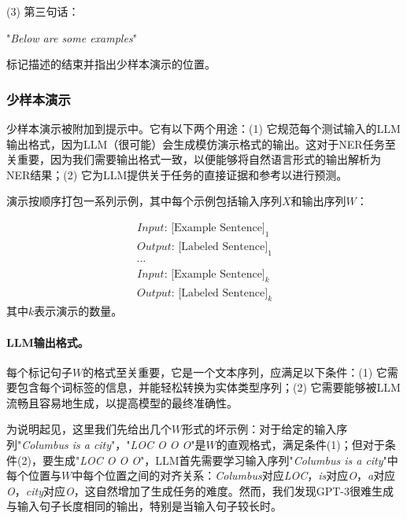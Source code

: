 \documentclass[supercite]{Experimental_Report}
\theoremstyle{definition}
\begin{document}
(3) 第三句话：

"\textit{Below are some examples}"

\noindent 标记描述的结束并指出少样本演示的位置。

\subsubsection{少样本演示}
\label{few_shot_demonstration}

少样本演示被附加到提示中。它有以下两个用途：(1) 它规范每个测试输入的LLM输出格式，因为LLM（很可能）会生成模仿演示格式的输出。这对于NER任务至关重要，因为我们需要输出格式一致，以便能够将自然语言形式的输出解析为NER结果；(2) 它为LLM提供关于任务的直接证据和参考以进行预测。

演示按顺序打包一系列示例，其中每个示例包括输入序列$X$和输出序列$W$：

\begin{equation}
\nonumber
    \begin{aligned}
      \textit{Input: }\text{[Example Sentence]}_{1} \\
      \textit{Output: }\text{[Labeled Sentence]}_{1} \\
      \cdots \\
      \textit{Input: }\text{[Example Sentence]}_{k} \\
      \textit{Output: }\text{[Labeled Sentence]}_{k}
    \end{aligned}
\end{equation}
其中$k$表示演示的数量。

\paragraph{LLM输出格式。}
\label{llm_format}
每个标记句子$W$的格式至关重要，它是一个文本序列，应满足以下条件：(1) 它需要包含每个词标签的信息，并能轻松转换为实体类型序列；(2) 它需要能够被LLM流畅且容易地生成，以提高模型的最终准确性。

为说明起见，这里我们先给出几个$W$形式的坏示例：对于给定的输入序列"{\it Columbus is a city}"，"{\it LOC O O O}"是$W$的直观格式，满足条件(1)；但对于条件(2)，要生成"{\it LOC O O O}"，LLM首先需要学习输入序列"{\it Columbus is a city}"中每个位置与$W$中每个位置之间的对齐关系：{\it Columbus}对应{\it LOC}，{\it is}对应{\it O}，{\it a}对应{\it O}，{\it city}对应{\it O}，这自然增加了生成任务的难度。然而，我们发现GPT-3很难生成与输入句子长度相同的输出，特别是当输入句子较长时。
\end{document}
